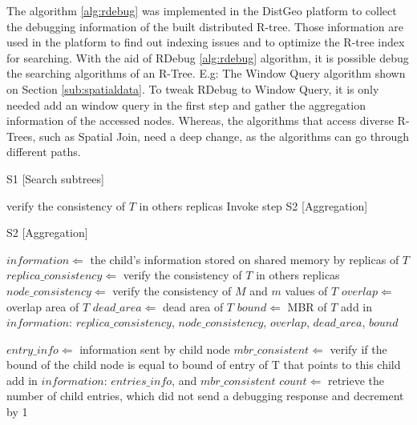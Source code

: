 	The algorithm \ref{alg:rdebug} was implemented in the DistGeo platform to collect the debugging information of the built distributed R-tree. Those information are used in the platform to find out indexing issues and to optimize the R-tree index for searching. With the aid of RDebug \ref{alg:rdebug} algorithm, it is possible debug the searching algorithms of an R-Tree. E.g: The Window Query algorithm shown on Section \ref{sub:spatialdata}. To tweak RDebug to Window Query, it is only needed add an window query in the first step and gather the aggregation information of the accessed nodes. Whereas, the algorithms that access diverse R-Trees, such as Spatial Join, need a deep change, as the algorithms can go through different paths.
		
\medskip
\begin{center}
\begin{minipage}{1\textwidth}
\begin{algorithm2e}[H]
\SetAlFnt{\small\sf}
 \DontPrintSemicolon
 \LinesNumbered
\SetAlgoLined
 \BlankLine
 \BlankLine
	
 S1 [Search subtrees]

{
  verify the consistency of $T$ in others replicas\;
	Invoke step S2 [Aggregation]\;
}

S2 [Aggregation]

$information \Leftarrow$ the child's information stored on shared memory by replicas of $T$\;
$replica\_consistency \Leftarrow$ verify the consistency of $T$ in others replicas\;
$node\_consistency \Leftarrow$	verify the consistency of $M$ and $m$ values of  $T$\;
$overlap \Leftarrow$ overlap area of $T$\;
$dead\_area \Leftarrow$ dead area of $T$\;
$bound \Leftarrow$ MBR of $T$\;
add in $information$: $replica\_consistency$, $node\_consistency$, $overlap$, $dead\_area$, $bound$\;

{
	  $entry\_info \Leftarrow$ information sent by child node\;
    $mbr\_consistent \Leftarrow$ verify if the bound of the child node is equal to bound of entry of T that points to this child\;
    add in $information$: $entries\_info$, and $mbr\_consistent$\;
		$count \Leftarrow$ retrieve the number of child entries, which did not send a debugging response and decrement by 1\;
		
}
\end{algorithm2e}
\end{minipage}
\end{center}
